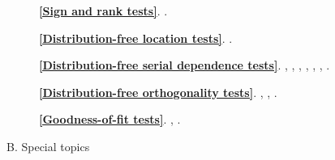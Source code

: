 \documentclass[titlepage,11pt,amstex]{article}
\begin{document}
\begin{description}
\item[\quad ] \textbf{\ref{Sign and rank tests}}. \cite%
{Dufour-Lepage-Zeidan(1982)}.

\item[\quad ] \textbf{\ref{Distribution-free location tests}}. \cite%
{Dufour-Hallin(1990)}.

\item[\quad ] \textbf{\ref{Distribution-free serial dependence tests}}. \cite%
{Dufour(1981)}, \cite{Dufour-Roy(1985)}, \cite{Dufour-Roy(1986)}, \cite%
{Dufour-Roy(1986b)}, \cite{Dufour-Hallin(1987)}, \cite%
{Dufour-Hallin-Mizera(1998)}, \cite{Dufour-Farhat-Hallin(2006)}.

\item[\quad ] \textbf{\ref{Distribution-free orthogonality tests}}. \cite%
{Campbell-Dufour(1991)}, \cite{Campbell-Dufour(1995)}, \cite%
{Campbell-Dufour(1997)}.

\item[\quad ] \textbf{\ref{Goodness-of-fit tests}}. \cite%
{Dufour-Farhat(2001)}, \cite{Dufour-Farhat(2001b)}.
\end{description}

\quad

\quad \newpage

\begin{center}
{\Huge B. Special topics}
\end{center}

\quad
\end{document}
